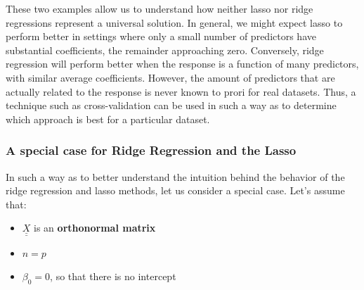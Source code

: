 These two examples allow us to understand how neither lasso nor ridge regressions represent a universal solution. In general, we might expect lasso to perform better in settings where only a small number of predictors have substantial coefficients, the remainder approaching zero. Conversely, ridge regression will perform better when the response is a function of many predictors, with similar average coefficients.
However, the amount of predictors that are actually related to the response is never known to prori for real datasets. Thus, a technique such as cross-validation can be used in such a way as to determine which approach is best for a particular dataset.





\subsubsection*{A special case for Ridge Regression and the Lasso}
In such a way as to better understand the intuition behind the behavior of the ridge regression and lasso methods, let us consider a special case.
Let's assume that:
\begin{itemize}
    \item $\underline{\underline X}$ is an \textbf{orthonormal matrix} 
    \item $n=p$
    \item $\beta_0 = 0$, so that there is no intercept
\end{itemize}

